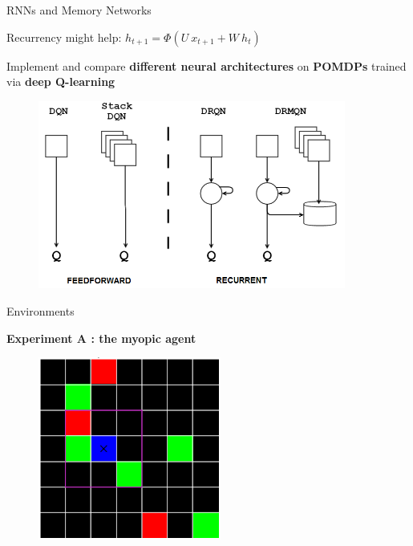 \documentclass{beamer}
\begin{document}
\begin{frame}{RNNs and Memory Networks}
	
	Recurrency might help:
	$h_{t+1} = \Phi(U \ x_{t+1}  +  W \ h_t) $
	
	Implement and compare \textbf{different neural architectures} on \textbf{POMDPs} trained via \textbf{deep Q-learning}
	
	\begin{figure}[!h]
		\centering
		\includegraphics[width=0.9\textwidth]{imgs/schema_archi.png}
	\end{figure}

\end{frame}

\begin{frame}{Environments}
	
	\textbf{Experiment A : the myopic agent}
	
	\begin{figure}
			\includegraphics[height=6cm]{imgs/myopic.png}
	\end{figure}	

\end{frame}
\end{document}
